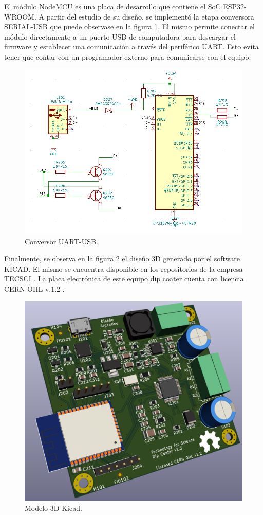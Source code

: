 El módulo NodeMCU es una placa de desarrollo que contiene el SoC ESP32-WROOM. A partir del estudio de su diseño, se implementó la etapa conversora SERIAL-USB que puede observase en la figura \ref{fig:kicad_conversor}. El mismo permite conectar el módulo directamente a un puerto USB de computadora para descargar el firmware y establecer una comunicación a través del periférico UART. Esto evita tener que contar con un programador externo para comunicarse con el equipo.
\begin{figure}[h]
	\centering
	\includegraphics[width=1\textwidth]{./Figures/kicad_conversor.png}
	\caption{Conversor UART-USB.}
	\label{fig:kicad_conversor}
\end{figure}

  
Finalmente, se observa en la figura \ref{fig:dip_3d_model} el diseño 3D generado por el software KICAD. El mismo se encuentra disponible en los repositorios de la empresa TECSCI \citep{web_hardware_tecsci}. La placa electrónica de este equipo dip coater cuenta con licencia CERN OHL v.1.2 \citep{web_cern_licence}.


\begin{figure}[h]
	\centering
	\includegraphics[width=.5\textwidth]{./Figures/dip_3d_model.pdf}
	\caption{Modelo 3D Kicad.}
	\label{fig:dip_3d_model}
\end{figure}
         



